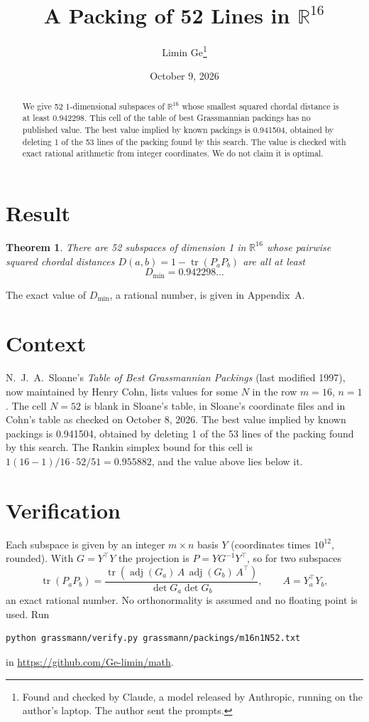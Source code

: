 \documentclass[11pt,a4paper]{article}
\title{A Packing of 52 Lines in $\mathbb{R}^{16}$}
\author{Limin Ge\thanks{Found and checked by Claude, a model released by Anthropic, running on the author's laptop. The author sent the prompts.}}
\date{October 9, 2026}
\newtheorem*{theorem}{Theorem}
\begin{document}
\maketitle
\begin{abstract}
We give 52 1-dimensional subspaces of $\mathbb{R}^{16}$ whose smallest squared chordal distance is at least 0.942298. This cell of the table of best Grassmannian packings has no published value. The best value implied by known packings is 0.941504, obtained by deleting 1 of the 53 lines of the packing found by this search. The value is checked with exact rational arithmetic from integer coordinates. We do not claim it is optimal.
\end{abstract}

\section{Result}
\begin{theorem}
There are 52 subspaces of dimension 1 in $\mathbb{R}^{16}$ whose pairwise squared chordal distances $D(a,b) = 1 - \operatorname{tr}(P_aP_b)$ are all at least
\[ D_{\min} = 0.942298\ldots \]
\end{theorem}
The exact value of $D_{\min}$, a rational number, is given in Appendix~A.


\section{Context}
N.~J.~A.~Sloane's \emph{Table of Best Grassmannian Packings} (last modified 1997), now maintained by Henry Cohn, lists values for some $N$ in the row $m=16$, $n=1$. The cell $N=52$ is blank in Sloane's table, in Sloane's coordinate files and in Cohn's table as checked on October 8, 2026. The best value implied by known packings is 0.941504, obtained by deleting 1 of the 53 lines of the packing found by this search. The Rankin simplex bound for this cell is $1(16-1)/16\cdot 52/51 = 0.955882$, and the value above lies below it.


\section{Verification}
Each subspace is given by an integer $m\times n$ basis $Y$ (coordinates times $10^{12}$, rounded). With $G=Y^\top Y$ the projection is $P=YG^{-1}Y^\top$, so for two subspaces
\[ \operatorname{tr}(P_aP_b)=\frac{\operatorname{tr}(\operatorname{adj}(G_a)\,A\,\operatorname{adj}(G_b)\,A^\top)}{\det G_a\det G_b},\qquad A=Y_a^\top Y_b, \]
an exact rational number. No orthonormality is assumed and no floating point is used. Run
\begin{verbatim}
python grassmann/verify.py grassmann/packings/m16n1N52.txt
\end{verbatim}
in \url{https://github.com/Ge-limin/math}.
\end{document}
